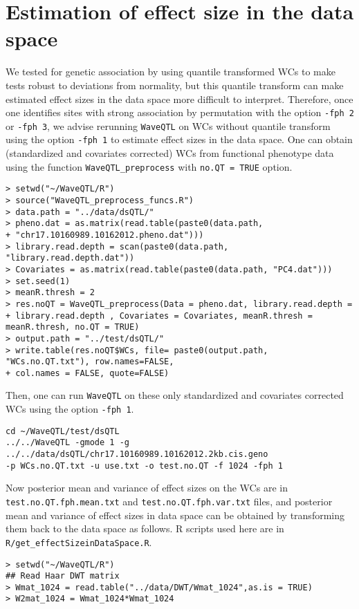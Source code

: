 \documentclass[11pt]{article}
\begin{document}
\section{Estimation of effect size in the data space}\label{EffectSizeEstimate} 
We tested for genetic association by using quantile transformed WCs to make tests robust to deviations from normality, but this quantile transform can make estimated effect sizes in the data space more difficult to interpret. Therefore, once one identifies sites with strong association by permutation with the option {\tt -fph 2} or {\tt -fph 3}, we advise rerunning {\tt WaveQTL} on WCs without quantile transform using the option {\tt -fph 1} to estimate effect sizes in the data space. One can obtain (standardized and covariates  corrected) WCs from functional phenotype data using the function {\tt WaveQTL\_preprocess} with {\tt no.QT = TRUE} option. 
\begin{verbatim}
> setwd("~/WaveQTL/R")
> source("WaveQTL_preprocess_funcs.R")
> data.path = "../data/dsQTL/"
> pheno.dat = as.matrix(read.table(paste0(data.path, 
+ "chr17.10160989.10162012.pheno.dat")))
> library.read.depth = scan(paste0(data.path, "library.read.depth.dat"))
> Covariates = as.matrix(read.table(paste0(data.path, "PC4.dat")))
> set.seed(1)
> meanR.thresh = 2
> res.noQT = WaveQTL_preprocess(Data = pheno.dat, library.read.depth =
+ library.read.depth , Covariates = Covariates, meanR.thresh = meanR.thresh, no.QT = TRUE)
> output.path = "../test/dsQTL/"
> write.table(res.noQT$WCs, file= paste0(output.path, "WCs.no.QT.txt"), row.names=FALSE, 
+ col.names = FALSE, quote=FALSE)
\end{verbatim}
Then, one can run {\tt WaveQTL} on these only standardized and covariates corrected WCs using the option {\tt -fph 1}.
\begin{verbatim}
cd ~/WaveQTL/test/dsQTL
../../WaveQTL -gmode 1 -g ../../data/dsQTL/chr17.10160989.10162012.2kb.cis.geno 
-p WCs.no.QT.txt -u use.txt -o test.no.QT -f 1024 -fph 1
\end{verbatim}
Now posterior mean and variance of effect sizes on the WCs are in {\tt test.no.QT.fph.mean.txt} and {\tt test.no.QT.fph.var.txt} files, and posterior mean and variance of effect sizes in data space can be obtained by transforming them back to the data space as follows. R scripts used here are in {\tt R/get\_effectSizeinDataSpace.R}.
\begin{verbatim}
> setwd("~/WaveQTL/R")
## Read Haar DWT matrix 
> Wmat_1024 = read.table("../data/DWT/Wmat_1024",as.is = TRUE)
> W2mat_1024 = Wmat_1024*Wmat_1024
\end{verbatim}
\end{document}
